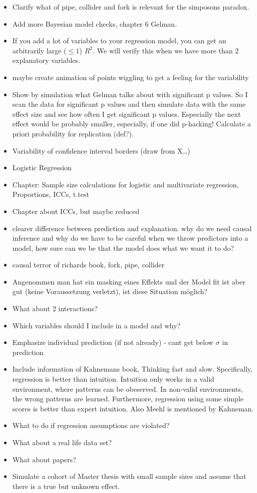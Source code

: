\documentclass[
]{book}
\providecommand{\tightlist}{%
  \setlength{\itemsep}{0pt}\setlength{\parskip}{0pt}}
\begin{document}
\begin{itemize}
\tightlist
\item
  Clarify what of pipe, collider and fork is relevant for the simposons paradox.
\item
  Add more Bayesian model checks, chapter 6 Gelman.
\item
  If you add a lot of variables to your regression model, you can get an arbitrarily large (\(\le 1\))
  \(R^2\). We will verify this when we have more than 2 explanatory variables.
\item
  maybe create animation of points wiggling to get a feeling for the variability
\item
  Show by simulation what Gelman talks about with significant p values. So I scan the data
  for significant p values and then simulate data with the same effect size and see how often
  I get significant p values. Especially the next effect would be probably smaller,
  especially, if one did p-hacking! Calculate a priori probability for replication (def?).
\item
  Variability of confidence interval borders (draw from X\ldots)
\item
  Logistic Regression
\item
  Chapter: Sample size calculations for logistic and multivariate regression, Proportions, ICCs, t.test
\item
  Chapter about ICCs, but maybe reduced
\item
  clearer difference between prediction and explanation. why do we need causal inference and
  why do we have to be careful when we throw predictors into a model, how sure can we be that
  the model does what we want it to do?
\item
  causal terror of richards book, fork, pipe, collider
\item
  Angenommen man hat ein masking eines Effekts und der Model fit ist aber gut (keine Voraussetzung verletzt),
  ist diese Situation möglich?
\item
  What about 2 interactions?
\item
  Which variables should I include in a model and why?
\item
  Emphasize individual prediction (if not already) - cant get below \(\sigma\) in prediction
\item
  Include information of Kahnemans book, Thinking fast and slow. Specifically, regression
  is better than intuition. Intuition only works in a valid environment, where patterns
  can be obeserved. In non-valid environments, the wrong patterns are learned. Furthermore,
  regression using some simple scores is better than expert intuition. Also Meehl is mentioned
  by Kahneman.
\item
  What to do if regression assumptions are violated?
\item
  What about a real life data set?
\item
  What about papers?
\item
  Simulate a cohort of Master thesis with small sample sizes and assume
  that there is a true but unknown effect.
\end{itemize}


\end{document}
